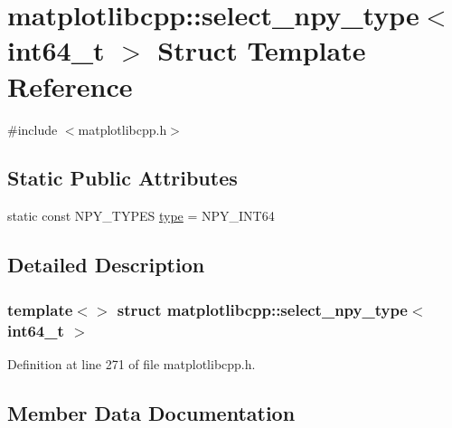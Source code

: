 \hypertarget{structmatplotlibcpp_1_1select__npy__type_3_01int64__t_01_4}{}\section{matplotlibcpp\+::select\+\_\+npy\+\_\+type$<$ int64\+\_\+t $>$ Struct Template Reference}
\label{structmatplotlibcpp_1_1select__npy__type_3_01int64__t_01_4}


{\ttfamily \#include $<$matplotlibcpp.\+h$>$}

\subsection*{Static Public Attributes}
\begin{DoxyCompactItemize}
\item 
static const N\+P\+Y\+\_\+\+T\+Y\+P\+ES \mbox{\hyperlink{structmatplotlibcpp_1_1select__npy__type_3_01int64__t_01_4_a0d20ea35e520ad9381aca3c173f3f02d}{type}} = N\+P\+Y\+\_\+\+I\+N\+T64
\end{DoxyCompactItemize}


\subsection{Detailed Description}
\subsubsection*{template$<$$>$\newline
struct matplotlibcpp\+::select\+\_\+npy\+\_\+type$<$ int64\+\_\+t $>$}



Definition at line 271 of file matplotlibcpp.\+h.



\subsection{Member Data Documentation}
\mbox{\label{structmatplotlibcpp_1_1select__npy__type_3_01int64__t_01_4_a0d20ea35e520ad9381aca3c173f3f02d}} 
